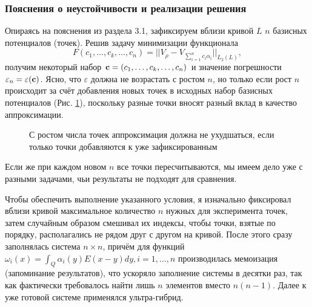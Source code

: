 \documentclass[a4paper]{article}
\newcommand{\V}[1]{\int_Q #1(y) E(x-y) dy}
\begin{document}
\subsubsection{Пояснения о неустойчивости и реализации решения}
Опираясь на пояснения из раздела 3.1, зафиксируем вблизи кривой $L$ $n$ базисных потенциалов (точек).
Решив задачу минимизации функционала
\begin{equation*}
  F(c_1,\dots,c_k,\dots,c_n)=||V_{\rho}-V_{\sum_{i=1}^n c_i \alpha_i}||_{L_2(L)},
\end{equation*}
получим некоторый набор ${\bf c}=(c_1,\dots,c_k,\dots,c_n)$ и значение погрешности $\varepsilon_n = \varepsilon ({\bf c})$.
Ясно, что $\varepsilon$ должна не возрастать с ростом $n$, но только если рост $n$ происходит за счёт добавления новых точек в исходных набор базисных потенциалов (Рис. \ref{points2}),
поскольку разные точки вносят разный вклад в качество аппроксимации.
\begin{figure}[h!]
  \noindent{}
  \caption{С ростом числа точек аппроксимация должна не ухудшаться, если только точки добавляются к уже зафиксированным}
  \label{points2}
  \end{figure} 

Если же при каждом новом $n$ все точки пересчитываются, мы имеем дело уже с разными задачами, чьи результаты не подходят для сравнения.

Чтобы обеспечить выполнение указанного условия, я изначально фиксировал вблизи кривой максимальное количество $n$ нужных для эксперимента точек,
затем случайным образом смешивал их индексы, чтобы точки, взятые по порядку, располагались не рядом друг с другом на кривой.
После этого сразу заполнялась система $n \times n$, причём для функций $\omega_i(x) =\V{\alpha_i}, i=1,\dots,n$ производилась мемоизация (запоминание результатов), что ускоряло заполнение системы в десятки раз, так как
фактически требовалось найти лишь $n$ элементов вместо $n(n-1)$.
Далее к уже готовой системе применялся ультра-гибрид.
\end{document}

